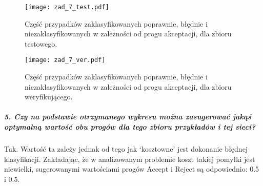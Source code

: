 \documentclass{article}
\begin{document}
\begin{figure}[H]
\begin{center}
\texttt{[image: zad\_7\_test.pdf]}
\end{center}
\caption{Część przypadków zaklasyfikowanych poprawnie, błędnie i niezaklasyfikowanych w zależności od progu akceptacji, dla zbioru testowego.}
\label{fig-1Tdelta}
\end{figure}

\begin{figure}[H]
\begin{center}
\texttt{[image: zad\_7\_ver.pdf]}
\end{center}
\caption{Część przypadków zaklasyfikowanych poprawnie, błędnie i niezaklasyfikowanych w zależności od progu akceptacji, dla zbioru weryfikującego.}
\label{fig-1Tdelta}
\end{figure}

\subparagraph{5. Czy na podstawie otrzymanego wykresu można zasugerować jakąś optymalną wartość obu progów dla tego zbioru przykładów i tej sieci?}

Tak. Wartość ta zależy jednak od tego jak `kosztowne' jest dokonanie błędnej klasyfikacji. Zakładając, że w analizowanym problemie koszt takiej pomyłki jest niewielki, sugerowanymi wartościami progów Accept i Reject są odpowiednio: 0.5 i 0.5.
\end{document}
